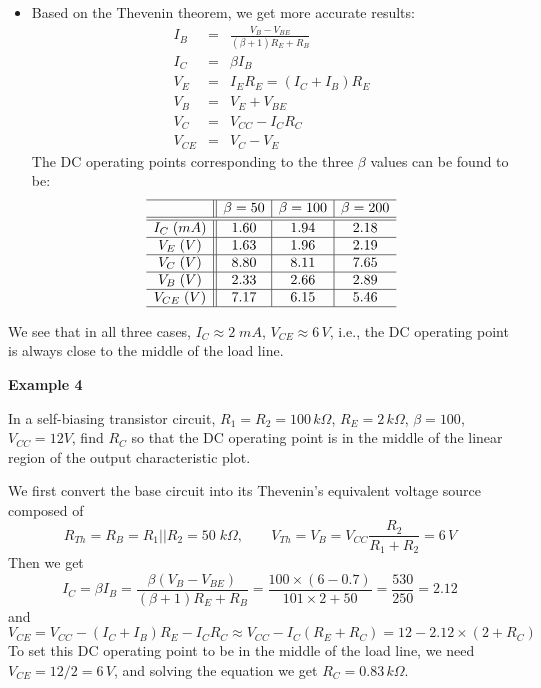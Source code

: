 \begin{itemize}
\begin{itemize}
\item Based on the Thevenin theorem, we get more accurate results:
\begin{eqnarray}
  I_B&=&\frac{V_B-V_{BE}}{(\beta+1) R_E+R_B}
  \nonumber\\
  I_C&=&\beta I_B
  \nonumber\\
  V_E&=&I_E R_E=(I_C+I_B)R_E
  \nonumber\\
  V_B&=&V_E+V_{BE}
  \nonumber\\
  V_C&=&V_{CC}-I_CR_C
  \nonumber\\
  V_{CE}&=&V_C-V_E
  \nonumber
\end{eqnarray} 
The DC operating points corresponding to the three $\beta$ values 
can be found to be:
\[
\begin{array}{c||c|c|c}\hline
      & \beta=50  & \beta=100 & \beta=200 \\\hline\hline
I_C\;(mA)  & 1.60 & 1.94     & 2.18      \\\hline
V_E\;(V)   & 1.63 & 1.96     & 2.19      \\\hline
V_C\;(V)   & 8.80 & 8.11     & 7.65      \\\hline
V_B\;(V)   & 2.33 & 2.66     & 2.89      \\\hline
V_{CE}\;(V) & 7.17 & 6.15     & 5.46      \\\hline
\end{array}
\]
\end{itemize}

We see that in all three cases, $I_C\approx 2\;mA$, 
$V_{CE}\approx 6\,V$, i.e., the DC operating point is always
close to the middle of the load line.

{\bf Example 4}

In a self-biasing transistor circuit, $R_1=R_2=100\,k\Omega$, $R_E=2\,k\Omega$, 
$\beta=100$, $V_{CC}=12V$, find $R_C$ so that the DC operating point is 
in the middle of the linear region of the output characteristic plot.

We first convert the base circuit into its Thevenin's equivalent voltage 
source composed of
\[ 
R_{Th}=R_B=R_1||R_2=50\;k\Omega,\;\;\;\;\;\;\;
V_{Th}=V_B=V_{CC}\frac{R_2}{R_1+R_2}=6\,V 
\]
Then we get
\[ 
I_C=\beta I_B=\frac{\beta(V_B-V_{BE})}{(\beta+1)R_E+R_B}
=\frac{100\times(6-0.7)}{101\times 2+50}=\frac{530}{250}=2.12
\]
and
\[
V_{CE}=V_{CC}-(I_C+I_B) R_E-I_CR_C\approx V_{CC}-I_C(R_E+R_C)
=12-2.12\times (2+R_C)
\]
To set this DC operating point to be in the middle of the load line, 
we need $V_{CE}=12/2=6\,V$, and solving the equation we get $R_C=0.83\,
k\Omega$.


\end{itemize}
